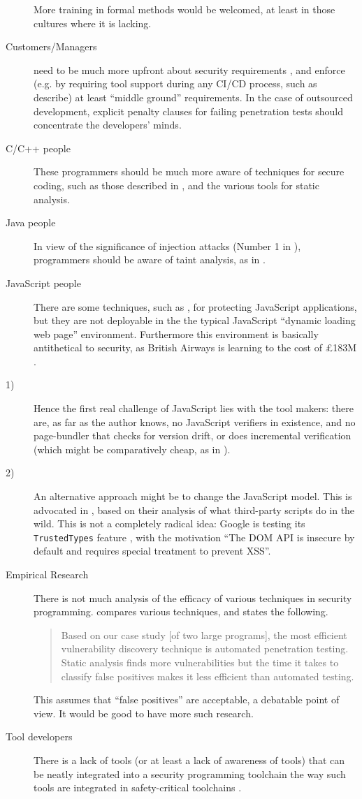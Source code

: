 \documentclass{eptcs}
\begin{document}
\begin{description}
More training in formal methods would be welcomed, at least in those cultures where it is lacking.
\item[Customers/Managers]need to be much more upfront about security requirements \cite{Naiakshinaetal2018a,Naiakshinaetal2019a}, and enforce (e.g. by requiring tool support during any CI/CD process, such as \cite{BrainSchanda2012a} describe) at least ``middle ground'' requirements. In the case of outsourced development, explicit penalty clauses for failing penetration tests should concentrate the developers' minds.
\item[C/C++ people]These programmers should be much more aware of techniques for secure coding, such as those described in  \cite[Appendix F]{CPNI2019a}, and the various tools for static analysis.
\item[Java people]In view of the significance of injection attacks (Number 1 in \cite{OWASP2017a}), programmers should be aware of taint analysis, as in \cite{LivshitsLam2005}.
\item[JavaScript people]There are some techniques, such as \cite{Maffeisetal2009},  for protecting JavaScript applications, but they are not deployable in the the typical JavaScript ``dynamic loading web page'' environment. Furthermore this environment is basically antithetical to security, as British Airways is learning to the cost of \pounds183M \cite{Guardian2019i}.
\item[1)]Hence the first real challenge of JavaScript lies with the tool makers: there are, as far as the author knows, no JavaScript verifiers in existence, and no page-bundler that checks for version drift, or does incremental verification (which might be comparatively cheap, as in \cite{BrainSchanda2012a}).
\item[2)]An alternative approach might be to change the JavaScript model. This is advocated in \cite{Zhangetal2019c}, based on their analysis of what third-party scripts do in the wild.  This is not a completely radical idea: Google is testing its \verb+TrustedTypes+ feature \cite{Kotowicz2019a}, with the motivation ``The DOM API is insecure by default and requires special treatment to prevent XSS''.
\item[Empirical Research]There is not much analysis of the efficacy of various techniques in security programming. \cite{AustinWilliams2011a} compares various techniques, and states the following.
\begin{quote}
Based on our case study [of two large programs], the most efficient vulnerability discovery technique is automated penetration testing.  Static analysis finds more vulnerabilities but the time it takes to classify false positives makes it less efficient than automated testing.
\end{quote}
This assumes that ``false positives'' are acceptable, a debatable point of view.  It would be good to have more such research.
\item[Tool developers]There is a lack of tools (or at least a lack of awareness of tools) that can be neatly integrated into a security programming toolchain the way such tools are integrated in safety-critical toolchains \cite{BrainSchanda2012a}.
\end{description}
\end{document}
